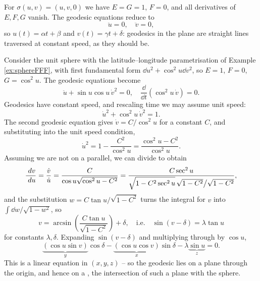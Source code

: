 \documentclass[a4paper]{scrartcl}
\begin{document}
\begin{example}
    For $\sigma(u, v) = (u, v, 0)$ we have $E = G = 1$, $F = 0$, and all derivatives of $E, F, G$ vanish. The geodesic equations reduce to
    $$
    \ddot u = 0, \quad \ddot v = 0,
    $$
    so $u(t) = \alpha t + \beta$ and $v(t) = \gamma t + \delta$: geodesics in the plane are straight lines traversed at constant speed, as they should be.
\end{example}

\begin{example}\label{ex:spheregeodesics}
    Consider the unit sphere with the latitude--longitude parametrisation of Example \ref{ex:sphereFFF}, with first fundamental form $\dd u^2 + \cos^2 u \dd v^2$, so $E = 1$, $F = 0$, $G = \cos^2 u$. The geodesic equations become
    $$
    \ddot u + \sin u \cos u \, \dot v^2 = 0, \quad \frac{\dd}{\dd t}\left(\cos^2 u \, \dot v\right) = 0.
    $$
    Geodesics have constant speed, and rescaling time we may assume unit speed:
    $$
    \dot u^2 + \cos^2 u \, \dot v^2 = 1.
    $$
    The second geodesic equation gives $\dot v = C/\cos^2 u$ for a constant $C$, and substituting into the unit speed condition,
    $$
    \dot u^2 = 1 - \frac{C^2}{\cos^2 u} = \frac{\cos^2 u - C^2}{\cos^2 u}.
    $$
    Assuming we are not on a parallel, we can divide to obtain
    $$
    \frac{\; d v}{\; d u} = \frac{\dot v}{\dot u} = \frac{C}{\cos u \sqrt{\cos^2 u - C^2}} = \frac{C \sec^2 u}{\sqrt{1 - C^2\sec^2 u \vphantom{\big(}}\,\sqrt{1 - C^2}\big/\sqrt{1 - C^2}},
    $$
    and the substitution $w = C \tan u / \sqrt{1 - C^2}$ turns the integral for $v$ into $\int \dd w/\sqrt{1 - w^2}$, so
    $$
    v = \arcsin\left(\frac{C \tan u}{\sqrt{1 - C^2}}\right) + \delta, \quad \text{i.e.} \quad \sin(v - \delta) = \lambda \tan u
    $$
    for constants $\lambda, \delta$. Expanding $\sin(v - \delta)$ and multiplying through by $\cos u$,
    $$
    \underbrace{(\cos u \sin v)}_{y} \cos\delta - \underbrace{(\cos u \cos v)}_{x}\sin \delta - \lambda \underbrace{\sin u}_{z} = 0.
    $$
    This is a linear equation in $(x, y, z)$ -- so the geodesic lies on a plane through the origin, and hence on a , the intersection of such a plane with the sphere.
    \begin{center}
\end{center}
\end{example}
\end{document}
